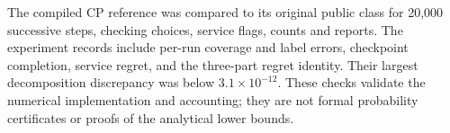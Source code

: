 \documentclass[11pt]{article}
\begin{document}
The compiled CP reference was compared to its original public class for
20,000 successive steps, checking choices, service flags, counts and reports.
The experiment records include per-run coverage and label errors, checkpoint
completion, service regret, and the three-part regret identity. Their largest
decomposition discrepancy was below $3.1\times10^{-12}$. These checks validate
the numerical implementation and accounting; they are not formal probability
certificates or proofs of the analytical lower bounds.

\FloatBarrier


\end{document}

